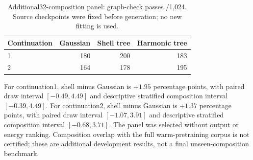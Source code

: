 \begin{table}[t]
\centering
\caption{Additional32-composition panel: graph-check passes /1,024. Source checkpoints were fixed before generation; no new fitting is used.}
\begin{tabular}{lrrr}
\toprule
Continuation & Gaussian & Shell tree & Harmonic tree\\
\midrule
1 & 180 & 200 & 183\\
2 & 164 & 178 & 195\\
\bottomrule
\end{tabular}
\label{tab:source-transfer}
\end{table}
For continuation1, shell minus Gaussian is $+1.95$ percentage points, with paired draw interval $[-0.49,4.49]$ and descriptive stratified composition interval $[-0.39,4.49]$.
For continuation2, shell minus Gaussian is $+1.37$ percentage points, with paired draw interval $[-1.07,3.91]$ and descriptive stratified composition interval $[-0.68,3.71]$.
The panel was selected without output or energy ranking. Composition overlap with the full warm-pretraining corpus is not certified; these are additional development results, not a final unseen-composition benchmark.
